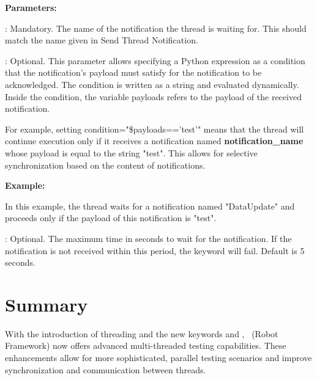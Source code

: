 \textbf{Parameters:}

: Mandatory. The name of the notification the thread is waiting for. This should match the name given in Send Thread Notification.

: Optional. This parameter allows specifying a Python expression as a condition that the notification's payload must satisfy for the notification to be acknowledged. The condition is written as a string and evaluated dynamically. Inside the condition, the variable payloads refers to the payload of the received notification.

For example, setting condition="\$payloads=='test'" means that the thread will continue execution only if it receives a notification named \textbf{notification\_name} whose payload is equal to the string "test". This allows for selective synchronization based on the content of notifications.

\textbf{Example:}

In this example, the thread waits for a notification named "DataUpdate" and proceeds only if the payload of this notification is "test".


: Optional. The maximum time in seconds to wait for the notification. If the notification is not received within this period, the keyword will fail. Default is 5 seconds.

\section{Summary}

With the introduction of threading and the new keywords  and , \rfw\ (Robot Framework) now offers advanced multi-threaded testing capabilities. These enhancements allow for more sophisticated, parallel testing scenarios and improve synchronization and communication between threads.


